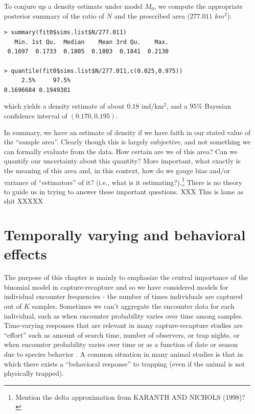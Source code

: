 To conjure up a
density estimate under model $M_0$, we compute the appropriate
posterior summary of the ratio of $N$ and the prescribed area ($277.011$ $km^2$):
{\small
\begin{verbatim}
> summary(fit0$sims.list$N/277.011)
   Min. 1st Qu.  Median    Mean 3rd Qu.    Max.
 0.1697  0.1733  0.1805  0.1803  0.1841  0.2130

> quantile(fit0$sims.list$N/277.011,c(0.025,0.975))
     2.5%     97.5%
0.1696684 0.1949381
\end{verbatim}
}
which yields a density estimate of about $0.18$ ind/km$^2$, and a $95\%$ Bayesian
confidence interval of $(0.170, 0.195)$.

In summary, we have an estimate of density if we have faith in our
stated value of the ``sample area''. Clearly though this is largely
subjective, and not something we can formally evaluate from the data.
How certain are we of this area? Can
we quantify our uncertainty about this quantity?
 More important, what exactly is
the meaning of this area and, in this context, how do we gauge bias
and/or variance of ``estimators'' of it? (i.e., what is it
estimating?).\footnote{Mention the delta approximation from
KARANTH AND NICHOLS (1998)?}
There is no theory to guide us in trying to answer these important questions.
XXX This is lame as shit XXXXX

\section{Temporally varying and behavioral effects}

The purpose of this chapter is mainly to emphasize the central
importance of the binomial model in capture-recapture and so we have
considered models for individual encounter frequencies - the number of
times individuals are captured out of $K$ samples.  Sometimes we can't
aggregate the encounter data for each individual, such as when
encounter probability varies over time among samples.  Time-varying
responses that are relevant in many capture-recapture studies are
``effort'' such as amount of search time, number of observers, or trap
nights, or when encounter probability varies over time or as a
function of date or season due to species behavior
\citep{kery_etal:2010}.  A common situation in many animal studies is
that in which there exists a ``behavioral response'' to trapping (even
if the animal is not physically trapped).

